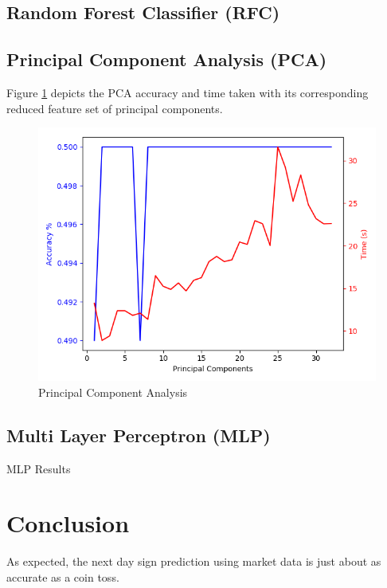 \documentclass{article}\raggedbottom
\begin{document}
\subsection{Random Forest Classifier (RFC)}
\subsection{Principal Component Analysis (PCA)}
Figure \ref{fig:PCA} depicts the PCA accuracy and time taken with its corresponding reduced feature set of principal components.

\begin{figure}[h!]
	\centering
	\includegraphics[width=\linewidth]{data/PCAT1.png}
	\caption{Principal Component Analysis}
	\label{fig:PCA}
\end{figure}

\subsection{Multi Layer Perceptron (MLP)}

\begin{table}[h]
	\centering
	\caption{MLP Results}
	\label{tab:MLP}
\end{table}
\section{Conclusion}
As expected, the next day sign prediction using market data is just about as accurate as a coin toss.

 

\end{document}
